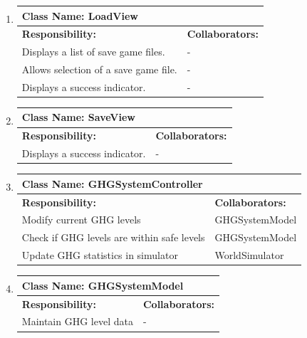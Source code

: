 \documentclass[]{article}
\begin{document}
\begin{enumerate}[1.]
\begin{tabular}{|p{10cm}|p{4cm}|}
	    \hline
	  \end{tabular}

	\item
	\begin{tabular}{|p{10cm}|p{4cm}|}
	    \hline
	     \multicolumn{2}{|l|}{\textbf{Class Name:  LoadView}} \\
	    \hline
	    \textbf{Responsibility:} & \textbf{Collaborators:} \\
	    \hline
	    Displays a list of save game files. & - \\
	Allows selection of a save game file. & - \\
	Displays a success indicator. & - \\

	    \hline
	  \end{tabular}

	\item
	\begin{tabular}{|p{10cm}|p{4cm}|}
	    \hline
	     \multicolumn{2}{|l|}{\textbf{Class Name:  SaveView}} \\
	    \hline
	    \textbf{Responsibility:} & \textbf{Collaborators:} \\
	    \hline
	    Displays a success indicator. & - \\

	    \hline
	  \end{tabular}

	\item
	\begin{tabular}{|p{10cm}|p{4cm}|}
	    \hline
	     \multicolumn{2}{|l|}{\textbf{Class Name:  GHGSystemController}} \\
	    \hline
	    \textbf{Responsibility:} & \textbf{Collaborators:} \\
	    \hline
	    Modify current GHG levels & GHGSystemModel \\
	Check if GHG levels are within safe levels & GHGSystemModel \\
	Update GHG statistics in simulator & WorldSimulator \\

	    \hline
	  \end{tabular}

	\item
	\begin{tabular}{|p{10cm}|p{4cm}|}
	    \hline
	     \multicolumn{2}{|l|}{\textbf{Class Name:  GHGSystemModel}} \\
	    \hline
	    \textbf{Responsibility:} & \textbf{Collaborators:} \\
	    \hline
	    Maintain GHG level data & - \\


\end{tabular}
\end{enumerate}
\end{document}
